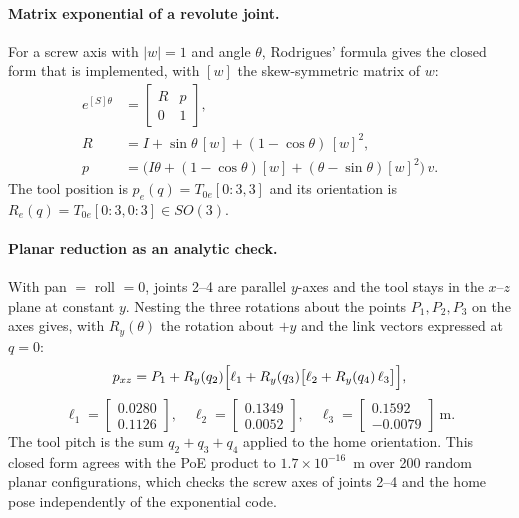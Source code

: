 \documentclass[11pt,a4paper]{article}
\begin{document}
\paragraph{Matrix exponential of a revolute joint.} For a screw axis with $|w|=1$ and angle $\theta$, Rodrigues' formula gives the closed form that is implemented, with $[w]$ the skew-symmetric matrix of $w$:
\begin{equation}
  \begin{aligned}
    e^{[S]\theta} &= \begin{bmatrix} R & p \\ 0 & 1 \end{bmatrix}, \\
    R &= I + \sin\theta\,[w] + (1-\cos\theta)\,[w]^2, \\
    p &= \bigl(I\theta + (1-\cos\theta)[w] + (\theta-\sin\theta)[w]^2\bigr)\, v .
  \end{aligned}
\end{equation}
The tool position is $p_e(q)=T_{0e}[0{:}3,3]$ and its orientation is $R_e(q)=T_{0e}[0{:}3,0{:}3]\in SO(3)$.

\paragraph{Planar reduction as an analytic check.} With pan $=$ roll $=0$, joints 2--4 are parallel $y$-axes and the tool stays in the $x$--$z$ plane at constant $y$. Nesting the three rotations about the points $P_1,P_2,P_3$ on the axes gives, with $R_y(\theta)$ the rotation about $+y$ and the link vectors expressed at $q=0$:
\begin{equation}
  p_{xz} = P_1 + R_y(q_2)\Bigl[\ell_1 + R_y(q_3)\bigl[\ell_2 + R_y(q_4)\,\ell_3\bigr]\Bigr],
\end{equation}
\begin{equation*}
  \ell_1 = \begin{bmatrix}0.0280\\0.1126\end{bmatrix},\quad
  \ell_2 = \begin{bmatrix}0.1349\\0.0052\end{bmatrix},\quad
  \ell_3 = \begin{bmatrix}0.1592\\-0.0079\end{bmatrix}\ \text{m}.
\end{equation*}
The tool pitch is the sum $q_2+q_3+q_4$ applied to the home orientation. This closed form agrees with the PoE product to $1.7\times10^{-16}$~m over 200 random planar configurations, which checks the screw axes of joints 2--4 and the home pose independently of the exponential code.
\end{document}
